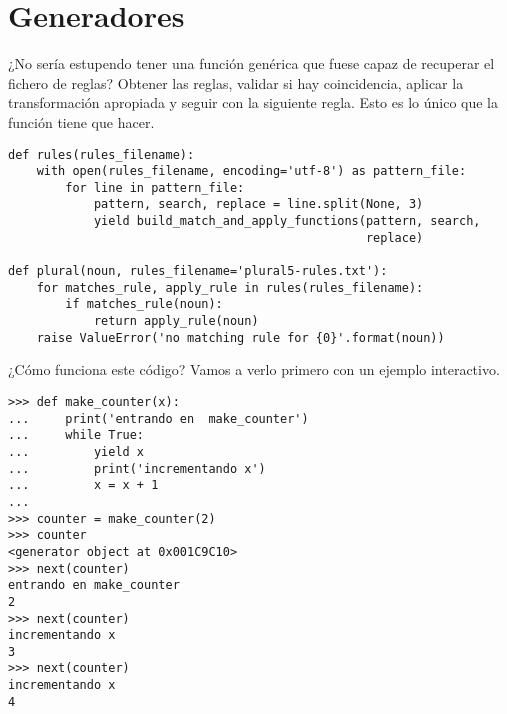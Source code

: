\section{Generadores}

¿No sería estupendo tener una función genérica que fuese capaz de recuperar el fichero de reglas? Obtener las reglas, validar si hay coincidencia, aplicar la transformación apropiada y seguir con la siguiente regla. Esto es lo único que la función  tiene que hacer.

\noindent\begin{minipage}{\textwidth}
\begin{lstlisting}[mathescape=True]
def rules(rules_filename):
    with open(rules_filename, encoding='utf-8') as pattern_file:
        for line in pattern_file:
            pattern, search, replace = line.split(None, 3)
            yield build_match_and_apply_functions(pattern, search,
                                                  replace)

def plural(noun, rules_filename='plural5-rules.txt'):
    for matches_rule, apply_rule in rules(rules_filename):
        if matches_rule(noun):
            return apply_rule(noun)
    raise ValueError('no matching rule for {0}'.format(noun))
\end{lstlisting}
\end{minipage}

¿Cómo funciona este código? Vamos a verlo primero con un ejemplo interactivo.

\noindent\begin{minipage}{\textwidth}
\begin{lstlisting}[mathescape=True]
>>> def make_counter(x):
...     print('entrando en  make_counter')
...     while True:
...         yield x
...         print('incrementando x')
...         x = x + 1
... 
>>> counter = make_counter(2)
>>> counter
<generator object at 0x001C9C10>
>>> next(counter)
entrando en make_counter
2
>>> next(counter)
incrementando x
3
>>> next(counter)
incrementando x
4
\end{lstlisting}
\end{minipage}

